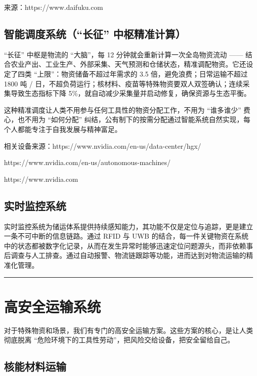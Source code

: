 来源：https://www.daifuku.com

\subsection{智能调度系统（``长征'' 中枢精准计算）}\label{ux667aux80fdux8c03ux5ea6ux7cfbux7edfux957fux5f81-ux4e2dux67a2ux7cbeux51c6ux8ba1ux7b97}

``长征'' 中枢是物流的 ``大脑''，每 12 分钟就会重新计算一次全岛物资流动 ------ 结合农业产出、工业生产、外部采集、天气预测和仓储状态，精准调配物资。它还设定了四类 ``上限''：物资储备不超过年需求的 3.5 倍，避免浪费；日常运输不超过 1800 吨 / 日，不超负荷运行；核材料、疫苗等特殊物资要双人双签确认；连续采集导致生态指标下降 5\%，就自动减少采集量并启动修复，确保资源与生态平衡。

这种精准调度让人类不用参与任何工具性的物资分配工作，不用为 ``谁多谁少'' 费心，也不用为 ``如何分配'' 纠结，公有制下的按需分配通过智能系统自然实现，每个人都能专注于自我发展与精神富足。

相关设备来源：https://www.nvidia.com/en-us/data-center/hgx/

https://www.nvidia.com/en-us/autonomous-machines/

https://www.nvidia.com

\subsection{实时监控系统}\label{ux5b9eux65f6ux76d1ux63a7ux7cfbux7edf}

实时监控系统为储运体系提供持续感知能力，其功能不仅是定位与追踪，更是建立一条不可中断的信息链路。通过 RFID 与 UWB 的结合，每一件关键物资在系统中的状态都被数字化记录，从而在发生异常时能够迅速定位问题源头，而非依赖事后调查与人工排查。通过自动报警、物流链跟踪等功能，进而达到对物流运输的精准化管理。

\begin{center}\rule{0.5\linewidth}{0.5pt}\end{center}

\section{高安全运输系统}\label{ux9ad8ux5b89ux5168ux8fd0ux8f93ux7cfbux7edf}

对于特殊物资和场景，我们有专门的高安全运输方案。这些方案的核心，是让人类彻底脱离 ``危险环境下的工具性劳动''，把风险交给设备，把安全留给自己。

\subsection{核能材料运输}\label{ux6838ux80fdux6750ux6599ux8fd0ux8f93}

